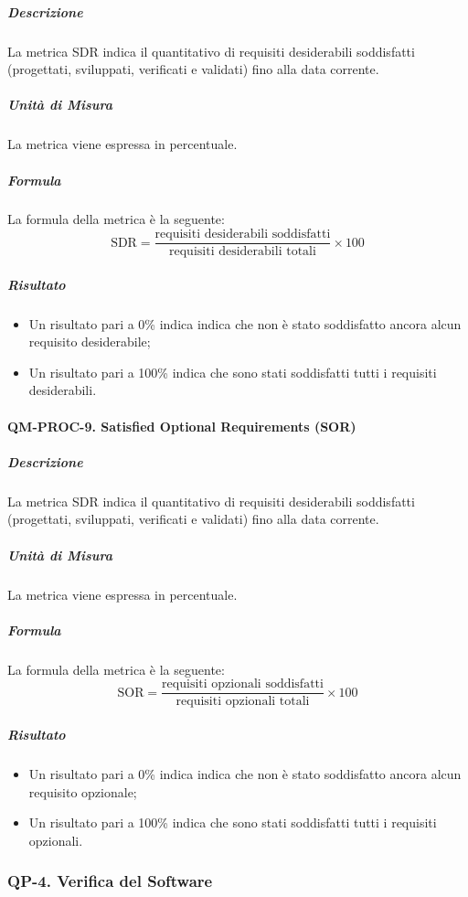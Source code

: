 			\subparagraph{Descrizione}
			La metrica SDR indica il quantitativo di requisiti desiderabili soddisfatti (progettati, sviluppati, verificati e validati) fino alla data corrente.

			\subparagraph{Unità di Misura}
			La metrica viene espressa in percentuale.

			\subparagraph{Formula}
			La formula della metrica è la seguente:
			\[
				\text{SDR} = \frac{\text{requisiti desiderabili soddisfatti}}{\text{requisiti desiderabili totali}} \times 100
			\]

			\subparagraph{Risultato}
			\begin{itemize}
				\item Un risultato pari a 0\% indica indica che non è stato soddisfatto ancora alcun requisito desiderabile;
				\item Un risultato pari a 100\% indica che sono stati soddisfatti tutti i requisiti desiderabili.
			\end{itemize}

		\paragraph{QM-PROC-9. Satisfied Optional Requirements (SOR)}

			\subparagraph{Descrizione}
			La metrica SDR indica il quantitativo di requisiti desiderabili soddisfatti (progettati, sviluppati, verificati e validati) fino alla data corrente.

			\subparagraph{Unità di Misura}
			La metrica viene espressa in percentuale.

			\subparagraph{Formula}
			La formula della metrica è la seguente:
			\[
				\text{SOR} = \frac{\text{requisiti opzionali soddisfatti}}{\text{requisiti opzionali totali}} \times 100
			\]

			\subparagraph{Risultato}
			\begin{itemize}
				\item Un risultato pari a 0\% indica indica che non è stato soddisfatto ancora alcun requisito opzionale;
				\item Un risultato pari a 100\% indica che sono stati soddisfatti tutti i requisiti opzionali.
			\end{itemize}

	\subsubsection{QP-4. Verifica del Software}

